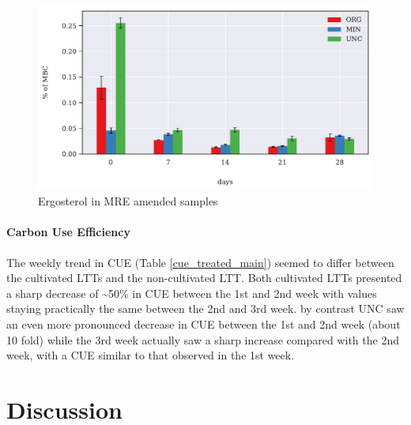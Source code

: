 \documentclass[12pt]{report}
\begin{document}
		\begin{figure}[H]
			
			\centering
			\includegraphics[scale=0.8]{thesis_figures/main_incubation/MRE_treated/Erg-to-MBC.pdf}
			\caption{Ergosterol in MRE amended samples}
			\label{fig:erg_treated_main}
		\end{figure}
	
	
	\subsubsection{Carbon Use Efficiency}
	The weekly trend in CUE (Table \ref{cue_treated_main}) seemed to differ between the cultivated LTTs and the non-cultivated LTT. Both cultivated LTTs presented a sharp decrease of \~{}50\% in CUE between the 1st and 2nd week with values staying practically the same between the 2nd and 3rd week. by contrast UNC saw an even more pronounced decrease in CUE between the 1st and 2nd week (about 10 fold) while the 3rd week actually saw a sharp increase compared with the 2nd week, with a CUE similar to that observed in the 1st week.
	
	
	

%			

	
	\chapter{Discussion}

\end{document}
